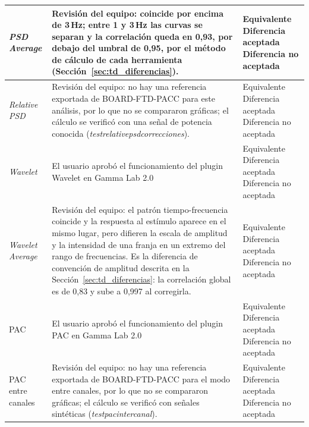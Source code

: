 \documentclass[12pt,letterpaper,oneside]{article}
\DeclareRobustCommand{\_}{\textunderscore\allowbreak}
\newcommand{\casilla}[1]{%
    \fbox{\makebox[1em][c]{#1}}%
}
\begin{document}
\begin{center}
\begin{longtable}{|>{\raggedright\arraybackslash}p{}|>{\raggedright\arraybackslash}p{}|>{\raggedright\arraybackslash}p{}|}
\hline
\textit{PSD Average} & Revisión del equipo: coincide por encima de 3\,Hz; entre 1 y 3\,Hz las curvas se separan y la correlación queda en 0,93, por debajo del umbral de 0,95, por el método de cálculo de cada herramienta (Sección~\ref{sec:td_diferencias}). & \casilla{} Equivalente \newline \casilla{} Diferencia aceptada \newline \casilla{x} Diferencia no aceptada \\
\hline
\textit{Relative PSD} & Revisión del equipo: no hay una referencia exportada de BOARD-FTD-PACC para este análisis, por lo que no se compararon gráficas; el cálculo se verificó con una señal de potencia conocida (\textit{test\_relative\_psd\_correcciones}). & \casilla{} Equivalente \newline \casilla{} Diferencia aceptada \newline \casilla{} Diferencia no aceptada \\
\hline
\textit{Wavelet} & El usuario aprobó el funcionamiento del plugin Wavelet en Gamma Lab 2.0 & \casilla{x} Equivalente \newline \casilla{} Diferencia aceptada \newline \casilla{} Diferencia no aceptada \\
\hline
\textit{Wavelet Average} & Revisión del equipo: el patrón tiempo-frecuencia coincide y la respuesta al estímulo aparece en el mismo lugar, pero difieren la escala de amplitud y la intensidad de una franja en un extremo del rango de frecuencias. Es la diferencia de convención de amplitud descrita en la Sección~\ref{sec:td_diferencias}: la correlación global es de 0,83 y sube a 0,997 al corregirla. & \casilla{} Equivalente \newline \casilla{x} Diferencia aceptada \newline \casilla{} Diferencia no aceptada \\
\hline
PAC & El usuario aprobó el funcionamiento del plugin PAC en Gamma Lab 2.0 & \casilla{x} Equivalente \newline \casilla{} Diferencia aceptada \newline \casilla{} Diferencia no aceptada \\
\hline
PAC entre canales & Revisión del equipo: no hay una referencia exportada de BOARD-FTD-PACC para el modo entre canales, por lo que no se compararon gráficas; el cálculo se verificó con señales sintéticas (\textit{test\_pac\_intercanal}). & \casilla{} Equivalente \newline \casilla{} Diferencia aceptada \newline \casilla{} Diferencia no aceptada \\

\end{longtable}
\end{center}
\end{document}
